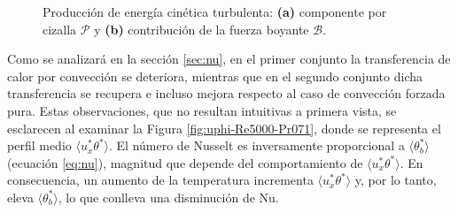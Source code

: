 \begin{figure}[H]
  \centering
  \caption{Producción de energía cinética turbulenta: \textbf{(a)} componente por cizalla $\mathcal{P}$ y \textbf{(b)} contribución de la fuerza boyante $\mathcal{B}$.}
  \label{fig:budgets_prod}
\end{figure}


Como se analizará en la sección \ref{sec:nu}, en el primer conjunto la transferencia de calor por convección se deteriora, mientras que en el segundo conjunto dicha transferencia se recupera e incluso mejora respecto al caso de convección forzada pura. Estas observaciones, que no resultan intuitivas a primera vista, se esclarecen al examinar la Figura \ref{fig:uphi-Re5000-Pr071}, donde se representa el perfil medio $\langle u_x^{*}\theta^{*}\rangle$. El número de Nusselt es inversamente proporcional a $\langle\theta^{*}_b\rangle$ (ecuación \ref{eq:nu}), magnitud que depende del comportamiento de $\langle u_x^{*}\theta^{*}\rangle$. En consecuencia, un aumento de la temperatura incrementa $\langle u_x^{*}\theta^{*}\rangle$ y, por lo tanto, eleva $\langle\theta^{*}_b\rangle$, lo que conlleva una disminución de Nu.

